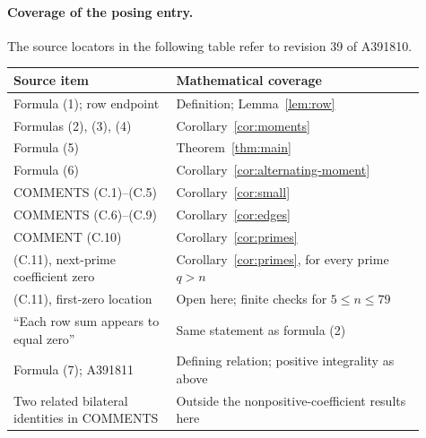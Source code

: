 \documentclass[11pt]{article}
\begin{document}
\paragraph{Coverage of the posing entry.}
The source locators in the following table refer to revision 39 of A391810.
\begin{center}\small
\begin{tabular}{>{\raggedright\arraybackslash}p{0.36\linewidth}>{\raggedright\arraybackslash}p{0.55\linewidth}}
\hline
Source item & Mathematical coverage\\ \hline
Formula (1); row endpoint & Definition; Lemma~\ref{lem:row}\\
Formulas (2), (3), (4) & Corollary~\ref{cor:moments}\\
Formula (5) & Theorem~\ref{thm:main}\\
Formula (6) & Corollary~\ref{cor:alternating-moment}\\
COMMENTS (C.1)--(C.5) & Corollary~\ref{cor:small}\\
COMMENTS (C.6)--(C.9) & Corollary~\ref{cor:edges}\\
COMMENT (C.10) & Corollary~\ref{cor:primes}\\
(C.11), next-prime coefficient zero & Corollary~\ref{cor:primes}, for every prime $q>n$\\
(C.11), first-zero location & Open here; finite checks for $5\leq n\leq79$\\
``Each row sum appears to equal zero'' & Same statement as formula (2)\\
Formula (7); A391811 & Defining relation; positive integrality as above\\
Two related bilateral identities in COMMENTS & Outside the nonpositive-coefficient results here\\ \hline
\end{tabular}
\end{center}
\end{document}
